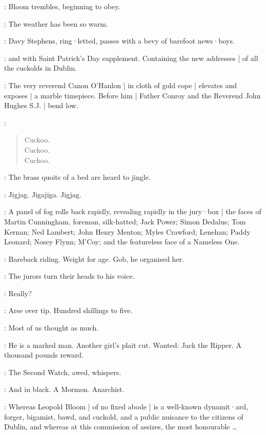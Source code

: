 :
Bloom trembles,
beginning to obey.

\Bloom:
The weather has been so warm.

:
Davy Stephens,
ring·letted,
passes with a bevy of barefoot news·boys.

\DavyStephens:
and 
with Saint Patrick's Day supplement.
Containing the new addresses |
of all the cuckolds in Dublin.

:
The very reverend Canon O'Hanlon |
in cloth of gold cope |
elevates and exposes |
a marble timepiece.
Before him |
Father Conroy and the Reverend John Hughes S.J. |
bend low.%

\Timepiece:
\begin{verse}
    Cuckoo.\\
    Cuckoo.\\
    Cuckoo.
\end{verse}

:
The brass quoits of a bed are heard to jingle.

\Quoits:
Jigjag.
Jigajiga.
Jigjag.

:
A panel of fog rolls back rapidly,
revealing rapidly in the jury·box |
the faces of Martin Cunningham,
foreman,
silk-hatted;
Jack Power;
Simon Dedalus;
Tom Kernan;
Ned Lambert;
John Henry Menton;
Myles Crawford;
Lenehan;
Paddy Leonard;
Nosey Flynn;
M'Coy;
and the featureless face of a Nameless One.

\NamelessOne:
Bareback riding.
Weight for age.
Gob,
he organised her.

:
The jurors turn their heads to his voice.

\Jurors:
Really?

\NamelessOne:
Arse over tip.
Hundred shillings to five.

\Jurors:
Most of us thought as much.

\FirstWatch[1]:
He is a marked man.
Another girl's plait cut.
Wanted:
Jack the Ripper.
A thousand pounds reward.

:
The Second Watch,
awed,
whispers.

\SecondWatch:
And in black.
A Mormon.
Anarchist.

\Crier:
Whereas Leopold Bloom |
of no fixed abode |
is a well-known dynamit·ard,
forger,
bigamist,
bawd,
and cuckold,
and a public nuisance to the citizens of Dublin,
and whereas at this commission of assizes,
the most honourable \ldots

